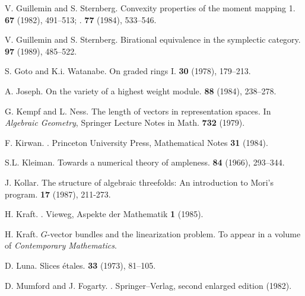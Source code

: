 \documentclass{article}
\begin{document}
\begin{thebibliography}{25}
  {V. Guillemin and S. Sternberg.}
  \newblock Convexity properties of the moment mapping 1.
   \textbf{67} (1982), 491--513;
  .
   \textbf{77} (1984), 533--546.

  {V. Guillemin and S. Sternberg.}
  \newblock Birational equivalence in the symplectic category.
   \textbf{97} (1989), 485--522.

  {S. Goto and K.i. Watanabe.}
  \newblock On graded rings I.
   \textbf{30} (1978), 179--213.

  {A. Joseph.}
  \newblock On the variety of a highest weight module.
   \textbf{88} (1984), 238--278.

  {G. Kempf and L. Ness.}
  \newblock The length of vectors in representation spaces.
  \newblock In {\em Algebraic Geometry}, Springer Lecture Notes in Math. \textbf{732} (1979).

  {F. Kirwan.}
  .
  \newblock Princeton University Press, Mathematical Notes \textbf{31} (1984).

  {S.L. Kleiman.}
  \newblock Towards a numerical theory of ampleness.
   \textbf{84} (1966), 293--344.

  {J. Kollar.}
  \newblock The structure of algebraic threefolds: An introduction to Mori's program.
   \textbf{17} (1987), 211-273.

  {H. Kraft.}
  .
  \newblock Vieweg, Aspekte der Mathematik \textbf{1} (1985).

  {H. Kraft.}
  \newblock $G$-vector bundles and the linearization problem.
  \newblock To appear in a volume of {\em Contemporary Mathematics}.

  {D. Luna.}
  \newblock Slices \'{e}tales.
   \textbf{33} (1973), 81--105.

  {D. Mumford and J. Fogarty.}
  .
  \newblock Springer--Verlag, second enlarged edition (1982).


\end{thebibliography}
\end{document}
